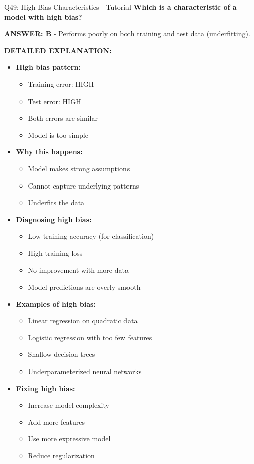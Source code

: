 \documentclass[8pt]{beamer}
\begin{document}
	\begin{frame}{Q49: High Bias Characteristics - Tutorial}
		\fontsize{6.5}{7.5}\selectfont
		\textbf{Which is a characteristic of a model with high bias?}
		
		\vspace{0.05cm}
		\textcolor{myblue}{\textbf{ANSWER: B}} - Performs poorly on both training and test data (underfitting).
		
		\vspace{0.05cm}
		\textbf{DETAILED EXPLANATION:}
		\begin{itemize}
			\item \textbf{High bias pattern:}
			\begin{itemize}
				\item Training error: HIGH
				\item Test error: HIGH
				\item Both errors are similar
				\item Model is too simple
			\end{itemize}
			\item \textbf{Why this happens:}
			\begin{itemize}
				\item Model makes strong assumptions
				\item Cannot capture underlying patterns
				\item Underfits the data
			\end{itemize}
			\item \textbf{Diagnosing high bias:}
			\begin{itemize}
				\item Low training accuracy (for classification)
				\item High training loss
				\item No improvement with more data
				\item Model predictions are overly smooth
			\end{itemize}
			\item \textbf{Examples of high bias:}
			\begin{itemize}
				\item Linear regression on quadratic data
				\item Logistic regression with too few features
				\item Shallow decision trees
				\item Underparameterized neural networks
			\end{itemize}
			\item \textbf{Fixing high bias:}
			\begin{itemize}
				\item Increase model complexity
				\item Add more features
				\item Use more expressive model
				\item Reduce regularization
			\end{itemize}
		\end{itemize}
		

\end{frame}
\end{document}
